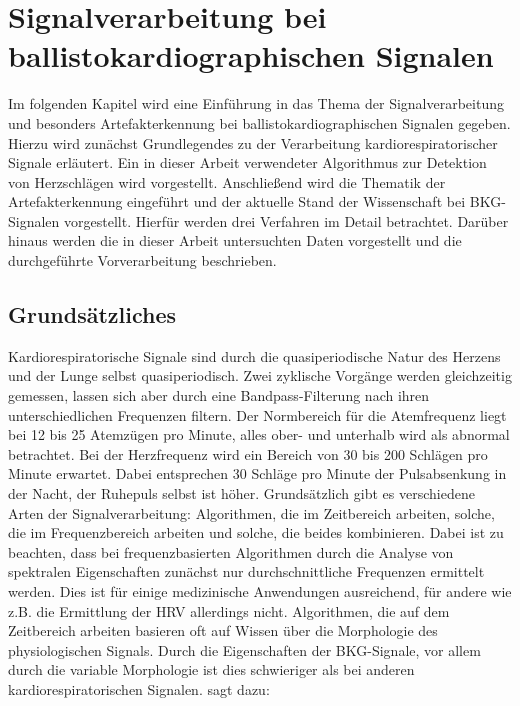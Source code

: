 \chapter{Signalverarbeitung bei ballistokardiographischen Signalen}

Im folgenden Kapitel wird eine Einführung in das Thema der Signalverarbeitung und besonders Artefakterkennung bei ballistokardiographischen Signalen gegeben. Hierzu wird zunächst Grundlegendes zu der Verarbeitung kardiorespiratorischer Signale erläutert. Ein in dieser Arbeit verwendeter Algorithmus zur Detektion von Herzschlägen wird vorgestellt. Anschließend wird die Thematik der Artefakterkennung eingeführt und der aktuelle Stand der Wissenschaft bei \ac{BKG}-Signalen vorgestellt. Hierfür werden drei Verfahren im Detail betrachtet. Darüber hinaus werden die in dieser Arbeit untersuchten Daten vorgestellt und die durchgeführte Vorverarbeitung beschrieben.

\section{Grundsätzliches} %

	Kardiorespiratorische Signale sind durch die quasiperiodische Natur des Herzens und der Lunge selbst quasiperiodisch. Zwei zyklische Vorgänge werden gleichzeitig gemessen, lassen sich aber durch eine Bandpass-Filterung nach ihren unterschiedlichen Frequenzen filtern. Der Normbereich für die Atemfrequenz liegt bei 12 bis 25 Atemzügen pro Minute, alles ober- und unterhalb wird als abnormal betrachtet. Bei der Herzfrequenz wird ein Bereich von 30 bis 200 Schlägen pro Minute erwartet. Dabei entsprechen 30 Schläge pro Minute der Pulsabsenkung in der Nacht, der Ruhepuls selbst ist höher. Grundsätzlich gibt es verschiedene Arten der Signalverarbeitung: Algorithmen, die im Zeitbereich arbeiten, solche, die im Frequenzbereich arbeiten und solche, die beides kombinieren. Dabei ist zu beachten, dass bei frequenzbasierten Algorithmen durch die Analyse von spektralen Eigenschaften zunächst nur durchschnittliche Frequenzen ermittelt werden. Dies ist für einige medizinische Anwendungen ausreichend, für andere wie z.B. die Ermittlung der \ac{HRV} allerdings nicht. Algorithmen, die auf dem Zeitbereich arbeiten basieren oft auf Wissen über die Morphologie des physiologischen Signals. Durch die Eigenschaften der \ac{BKG}-Signale, vor allem durch die variable Morphologie ist dies schwieriger als bei anderen kardiorespiratorischen Signalen. \citeauthor{Paalasmaa2015} sagt dazu:

